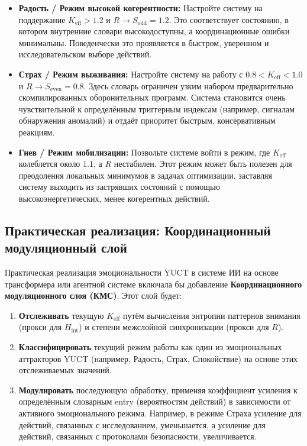 \documentclass[12pt,a4paper]{article}
\begin{document}
	\begin{itemize}
		\item \textbf{Радость / Режим высокой когерентности:} Настройте систему на поддержание \(K_{\mathrm{eff}} > 1.2\) и \(R \to S_{\mathrm{odd}} = 1.2\). Это соответствует состоянию, в котором внутренние словари высокодоступны, а координационные ошибки минимальны. Поведенчески это проявляется в быстром, уверенном и исследовательском выборе действий.
		\item \textbf{Страх / Режим выживания:} Настройте систему на работу с \(0.8 < K_{\mathrm{eff}} < 1.0\) и \(R \to S_{\mathrm{even}} = 0.8\). Здесь словарь ограничен узким набором предварительно скомпилированных оборонительных программ. Система становится очень чувствительной к определённым триггерным индексам (например, сигналам обнаружения аномалий) и отдаёт приоритет быстрым, консервативным реакциям.
		\item \textbf{Гнев / Режим мобилизации:} Позвольте системе войти в режим, где \(K_{\mathrm{eff}}\) колеблется около \(1.1\), а \(R\) нестабилен. Этот режим может быть полезен для преодоления локальных минимумов в задачах оптимизации, заставляя систему выходить из застрявших состояний с помощью высокоэнергетических, менее когерентных действий.
	\end{itemize}
	
	\subsection{Практическая реализация: Координационный модуляционный слой}
	
	Практическая реализация эмоциональности YUCT в системе ИИ на основе трансформера или агентной системе включала бы добавление \textbf{Координационного модуляционного слоя (КМС)}. Этот слой будет:
	
	\begin{enumerate}
		\item \textbf{Отслеживать} текущую \(K_{\mathrm{eff}}\) путём вычисления энтропии паттернов внимания (прокси для \(H_{\mathrm{int}}\)) и степени межслойной синхронизации (прокси для \(R\)).
		\item \textbf{Классифицировать} текущий режим работы как один из эмоциональных аттракторов YUCT (например, Радость, Страх, Спокойствие) на основе этих отслеживаемых значений.
		\item \textbf{Модулировать} последующую обработку, применяя коэффициент усиления к определённым словарным entry (вероятностям действий) в зависимости от активного эмоционального режима. Например, в режиме Страха усиление для действий, связанных с исследованием, уменьшается, а усиление для действий, связанных с протоколами безопасности, увеличивается.
	\end{enumerate}
	
\end{document}
